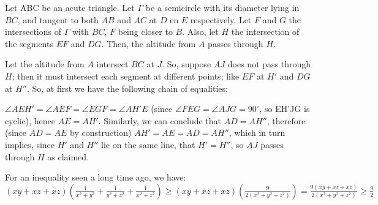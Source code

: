 \documentclass[12pt]{minimal}
\begin{document}
    Let ABC be an acute triangle. Let $\Gamma$ be a semicircle with its diameter
    lying in $BC$, and tangent to both $AB$ and $AC$ at $D$ en $E$ respectively.
    Let $F$ and $G$ the intersections of $\Gamma$ with $BC$, $F$ being closer to
    $B$. Also, let $H$ the intersection of the segments $EF$ and $DG$. Then, the
    altitude from $A$ passes through $H$.


    Let the altitude from $A$ intersect $BC$ at $J$. So, suppose $AJ$ does not
    pass through $H$; then it must intersect each segment at different points;
    like $EF$ at $H'$ and $DG$ at $H''$. So, at first we have the following
    chain of equalities:


    $\angle AEH' = \angle AEF = \angle EGF = \angle AH'E$ (since $\angle FEG =
    \angle AJG = 90^{\circ}$, so EH'JG is cyclic), hence $AE = AH'$. Similarly, we
    can conclude that $AD = AH''$, therefore (since $AD = AE$ by construction)
    $AH' = AE = AD = AH''$, which in turn implies, since $H'$ and $H''$ lie on
    the same line, that $H' = H''$, so $AJ$ passes through $H$ as claimed.

	For an inequality seen a long time ago, we have:
	$(xy + xz + xz)\left(\frac{1}{x^2 + y^2} + \frac{1}{y^2 + z^2} +
	\frac{1}{x^2 + z^2}\right) \geq
	(xy + xz + xz)\left(\frac{9}{2(x^2 + y^2 + z^2)}\right) =
	\frac{9(xy + xz + xz)}{2(x^2 + y^2 + z^2)} \geq \frac{9}{2}$
\end{document}
